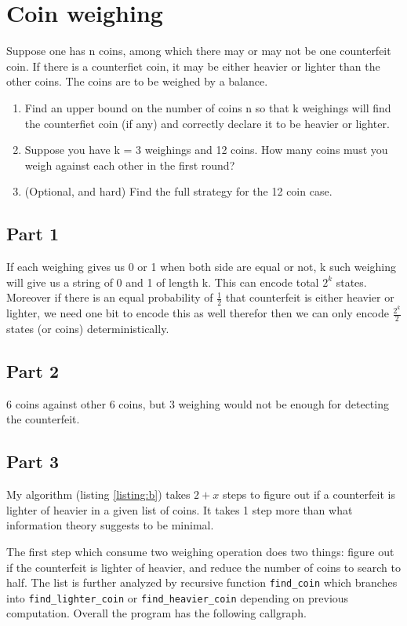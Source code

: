 \documentclass[a4paper,10pt]{article}
\begin{document}
\section{Coin weighing}

Suppose one has n coins, among which there may or may not be one counterfeit
coin. If there is a counterfiet coin, it may be either heavier or lighter than
the other coins. The coins are to be weighed by a balance.

\begin{enumerate}
    \item Find an upper bound on the number of coins n so that k weighings will find the
counterfiet coin (if any) and correctly declare it to be heavier or lighter.
    \item Suppose you have k = 3 weighings and 12 coins. How many coins must you weigh
against each other in the first round?
    \item (Optional, and hard) Find the full strategy for the 12 coin case.
\end{enumerate}

\subsection{Part 1}

If each weighing gives us 0 or 1 when both side are equal or not, k such
weighing will give us a string of 0 and 1 of length k. This can encode total
$2^k$ states. Moreover if there is an equal probability of $\frac{1}{2}$ that
counterfeit is either heavier or lighter, we need one bit to encode this as well
therefor then we can only encode $\frac{2^k}{2}$ states (or coins)
deterministically.

\subsection{Part 2}
6 coins against other 6 coins, but 3 weighing would not be enough for detecting
the counterfeit.

\subsection{Part 3}

My algorithm (listing \ref{listing:b}) takes $2+x$ steps to figure out if a
counterfeit is lighter of heavier in a given list of coins. It takes 1 step more
than what information theory suggests to be minimal.

The first step which consume two weighing operation does two things: figure out
if the counterfeit is lighter of heavier, and reduce the number of coins to
search to half. The list is further analyzed by recursive function
\texttt{find\_coin} which branches into \texttt{find\_lighter\_coin} or
\texttt{find\_heavier\_coin} depending on previous computation. Overall the
program has the following callgraph.
\end{document}
